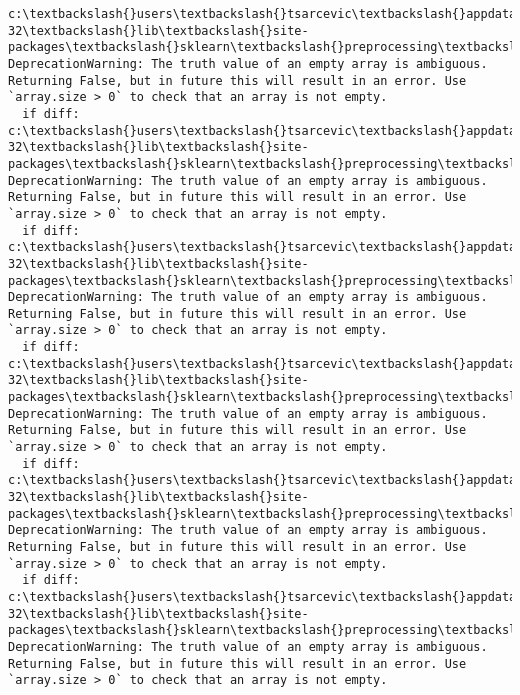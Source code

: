 \documentclass[11pt]{article}
\begin{document}
    \begin{Verbatim}[commandchars=\\\{\}]
c:\textbackslash{}users\textbackslash{}tsarcevic\textbackslash{}appdata\textbackslash{}local\textbackslash{}programs\textbackslash{}python\textbackslash{}python37-32\textbackslash{}lib\textbackslash{}site-packages\textbackslash{}sklearn\textbackslash{}preprocessing\textbackslash{}label.py:151: DeprecationWarning: The truth value of an empty array is ambiguous. Returning False, but in future this will result in an error. Use `array.size > 0` to check that an array is not empty.
  if diff:
c:\textbackslash{}users\textbackslash{}tsarcevic\textbackslash{}appdata\textbackslash{}local\textbackslash{}programs\textbackslash{}python\textbackslash{}python37-32\textbackslash{}lib\textbackslash{}site-packages\textbackslash{}sklearn\textbackslash{}preprocessing\textbackslash{}label.py:151: DeprecationWarning: The truth value of an empty array is ambiguous. Returning False, but in future this will result in an error. Use `array.size > 0` to check that an array is not empty.
  if diff:
c:\textbackslash{}users\textbackslash{}tsarcevic\textbackslash{}appdata\textbackslash{}local\textbackslash{}programs\textbackslash{}python\textbackslash{}python37-32\textbackslash{}lib\textbackslash{}site-packages\textbackslash{}sklearn\textbackslash{}preprocessing\textbackslash{}label.py:151: DeprecationWarning: The truth value of an empty array is ambiguous. Returning False, but in future this will result in an error. Use `array.size > 0` to check that an array is not empty.
  if diff:
c:\textbackslash{}users\textbackslash{}tsarcevic\textbackslash{}appdata\textbackslash{}local\textbackslash{}programs\textbackslash{}python\textbackslash{}python37-32\textbackslash{}lib\textbackslash{}site-packages\textbackslash{}sklearn\textbackslash{}preprocessing\textbackslash{}label.py:151: DeprecationWarning: The truth value of an empty array is ambiguous. Returning False, but in future this will result in an error. Use `array.size > 0` to check that an array is not empty.
  if diff:
c:\textbackslash{}users\textbackslash{}tsarcevic\textbackslash{}appdata\textbackslash{}local\textbackslash{}programs\textbackslash{}python\textbackslash{}python37-32\textbackslash{}lib\textbackslash{}site-packages\textbackslash{}sklearn\textbackslash{}preprocessing\textbackslash{}label.py:151: DeprecationWarning: The truth value of an empty array is ambiguous. Returning False, but in future this will result in an error. Use `array.size > 0` to check that an array is not empty.
  if diff:
c:\textbackslash{}users\textbackslash{}tsarcevic\textbackslash{}appdata\textbackslash{}local\textbackslash{}programs\textbackslash{}python\textbackslash{}python37-32\textbackslash{}lib\textbackslash{}site-packages\textbackslash{}sklearn\textbackslash{}preprocessing\textbackslash{}label.py:151: DeprecationWarning: The truth value of an empty array is ambiguous. Returning False, but in future this will result in an error. Use `array.size > 0` to check that an array is not empty.

\end{Verbatim}
\end{document}
